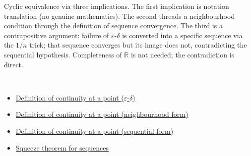 \begin{remark*}
Cyclic equivalence via three implications. The first implication is
notation translation (no genuine mathematics). The second threads
a neighbourhood condition through the definition of sequence convergence.
The third is a contrapositive argument: failure of $\varepsilon$-$\delta$
is converted into a specific sequence via the $1/n$ trick; that sequence
converges but its image does not, contradicting the sequential hypothesis.
Completeness of $\mathbb{R}$ is not needed; the contradiction is direct.
\end{remark*}

\begin{remark*}[Dependencies]~\\
\begin{itemize}
  \item \hyperref[def:continuous-at-point]{Definition of continuity at a point ($\varepsilon$-$\delta$)}
  \item \hyperref[def:continuous-at-point-nbhd]{Definition of continuity at a point (neighbourhood form)}
  \item \hyperref[def:continuous-at-point-seq]{Definition of continuity at a point (sequential form)}
  \item \hyperref[thm:squeeze]{Squeeze theorem for sequences}
\end{itemize}
\end{remark*}
